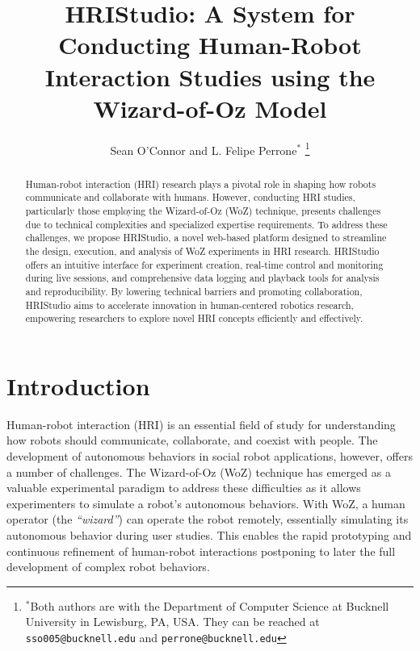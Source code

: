 \documentclass[letterpaper, 10 pt, conference]{ieeeconf}
\title{\LARGE \bf HRIStudio: A System for Conducting Human-Robot Interaction Studies using the Wizard-of-Oz Model}
\author{Sean O'Connor and L. Felipe Perrone$^{*}$%
    \thanks{$^{*}$Both authors are with the Department of Computer Science at
        Bucknell University in Lewisburg, PA, USA. They can be reached at {\tt\small sso005@bucknell.edu} and {\tt\small perrone@bucknell.edu}}%
}
\begin{document}
\maketitle
\thispagestyle{empty}
\pagestyle{empty}


\begin{abstract}

Human-robot interaction (HRI) research plays a pivotal role in shaping how robots communicate and collaborate with humans. However, conducting HRI studies, particularly those employing the Wizard-of-Oz (WoZ) technique, presents challenges due to technical complexities and specialized expertise requirements. To address these challenges, we propose HRIStudio, a novel web-based platform designed to streamline the design, execution, and analysis of WoZ experiments in HRI research. HRIStudio offers an intuitive interface for experiment creation, real-time control and monitoring during live sessions, and comprehensive data logging and playback tools for analysis and reproducibility. By lowering technical barriers and promoting collaboration, HRIStudio aims to accelerate innovation in human-centered robotics research, empowering researchers to explore novel HRI concepts efficiently and effectively.

\end{abstract}




\section{Introduction}

Human-robot interaction (HRI) is an essential field of study for understanding how robots should communicate, collaborate, and coexist with people. The development of autonomous behaviors in social robot applications, however, offers a number of challenges. The Wizard-of-Oz (WoZ) technique has emerged as a valuable experimental paradigm to address these difficulties as it allows experimenters to simulate a robot's autonomous behaviors. With WoZ, a human operator (the \emph{``wizard''}) can operate the robot remotely, essentially simulating its autonomous behavior during user studies. This enables the rapid prototyping and continuous refinement of human-robot interactions postponing to later the full development of complex robot behaviors.
\end{document}
